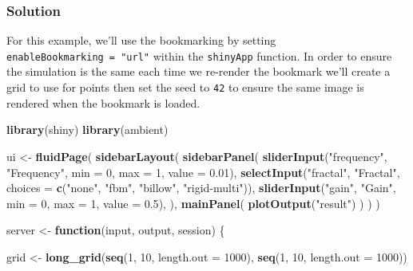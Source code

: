 \documentclass[]{book}
\newenvironment{Shaded}{\begin{snugshade}}{\end{snugshade}}
\newcommand{\ControlFlowTok}[1]{\textcolor[rgb]{0.13,0.29,0.53}{\textbf{#1}}}
\newcommand{\DataTypeTok}[1]{\textcolor[rgb]{0.13,0.29,0.53}{#1}}
\newcommand{\DecValTok}[1]{\textcolor[rgb]{0.00,0.00,0.81}{#1}}
\newcommand{\FloatTok}[1]{\textcolor[rgb]{0.00,0.00,0.81}{#1}}
\newcommand{\KeywordTok}[1]{\textcolor[rgb]{0.13,0.29,0.53}{\textbf{#1}}}
\newcommand{\NormalTok}[1]{#1}
\newcommand{\StringTok}[1]{\textcolor[rgb]{0.31,0.60,0.02}{#1}}
\begin{document}
\begin{solution}

\hypertarget{solution}{%
\subsubsection*{Solution}\label{solution}}

For this example, we'll use the bookmarking by setting \texttt{enableBookmarking\ =\ "url"} within the \texttt{shinyApp} function. In order to ensure the simulation is the same each time we re-render the bookmark we'll create a grid to use for points then set the seed to \texttt{42} to ensure the same image is rendered when the bookmark is loaded.

\begin{Shaded}
\begin{Highlighting}[]
\KeywordTok{library}\NormalTok{(shiny)}
\KeywordTok{library}\NormalTok{(ambient)}

\NormalTok{ui <-}\StringTok{ }\KeywordTok{fluidPage}\NormalTok{(}
    \KeywordTok{sidebarLayout}\NormalTok{(}
        \KeywordTok{sidebarPanel}\NormalTok{(}
            \KeywordTok{sliderInput}\NormalTok{(}\StringTok{"frequency"}\NormalTok{, }\StringTok{"Frequency"}\NormalTok{, }\DataTypeTok{min =} \DecValTok{0}\NormalTok{, }\DataTypeTok{max =} \DecValTok{1}\NormalTok{, }\DataTypeTok{value =} \FloatTok{0.01}\NormalTok{),}
            \KeywordTok{selectInput}\NormalTok{(}\StringTok{"fractal"}\NormalTok{, }\StringTok{"Fractal"}\NormalTok{, }\DataTypeTok{choices =} \KeywordTok{c}\NormalTok{(}\StringTok{"none"}\NormalTok{, }\StringTok{"fbm"}\NormalTok{, }\StringTok{"billow"}\NormalTok{, }\StringTok{"rigid-multi"}\NormalTok{)),}
            \KeywordTok{sliderInput}\NormalTok{(}\StringTok{"gain"}\NormalTok{, }\StringTok{"Gain"}\NormalTok{, }\DataTypeTok{min =} \DecValTok{0}\NormalTok{, }\DataTypeTok{max =} \DecValTok{1}\NormalTok{, }\DataTypeTok{value =} \FloatTok{0.5}\NormalTok{),}
\NormalTok{        ),}
        \KeywordTok{mainPanel}\NormalTok{(}
           \KeywordTok{plotOutput}\NormalTok{(}\StringTok{"result"}\NormalTok{)}
\NormalTok{        )}
\NormalTok{    )}
\NormalTok{)}


\NormalTok{server <-}\StringTok{ }\ControlFlowTok{function}\NormalTok{(input, output, session) \{}

\NormalTok{    grid <-}\StringTok{ }\KeywordTok{long_grid}\NormalTok{(}\KeywordTok{seq}\NormalTok{(}\DecValTok{1}\NormalTok{, }\DecValTok{10}\NormalTok{, }\DataTypeTok{length.out =} \DecValTok{1000}\NormalTok{), }\KeywordTok{seq}\NormalTok{(}\DecValTok{1}\NormalTok{, }\DecValTok{10}\NormalTok{, }\DataTypeTok{length.out =} \DecValTok{1000}\NormalTok{))}


\end{Highlighting}
\end{Shaded}
\end{solution}
\end{document}
